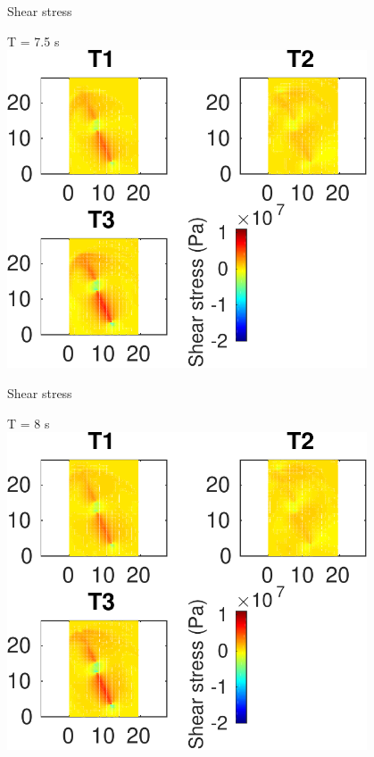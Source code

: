 \documentclass{beamer}
\begin{document}
\begin{frame}
 {Shear stress}
 
 \centering \Large T = 7.5 s\\
 \includegraphics[width=0.8\textwidth]{images/horizontal_00081}
 
\end{frame}

\begin{frame}
 {Shear stress}
 
 \centering \Large T = 8 s\\
 \includegraphics[width=0.8\textwidth]{images/horizontal_00086}
 
\end{frame}
\end{document}
